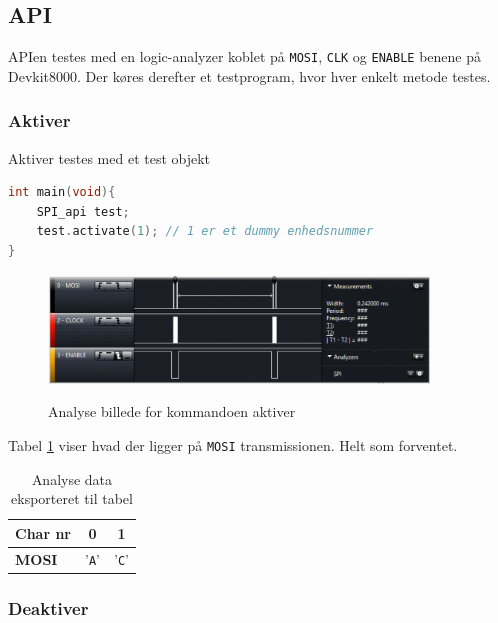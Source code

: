 
\subsection{API}

APIen testes med en logic-analyzer koblet på \verb+MOSI+, \verb+CLK+ og \verb+ENABLE+ benene på Devkit8000. Der køres derefter et testprogram, hvor hver enkelt metode testes.


\subsubsection*{Aktiver}

Aktiver testes med et test objekt

\begin{lstlisting}[language=C]
int main(void){
	SPI_api test;
	test.activate(1); // 1 er et dummy enhedsnummer
}
\end{lstlisting}

\begin{figure}[H]
\centering
{\includegraphics[width=0.90\textwidth]{filer/modultest/Billeder/mt_activate}}
\caption{Analyse billede for kommandoen aktiver}
\label{lab:mt_activate}
\end{figure}

Tabel \ref{table:mt_activate} viser hvad der ligger på \verb+MOSI+ transmissionen. Helt som forventet.

\begin{table}[H]
	\caption{Analyse data eksporteret til tabel}
	\centering
	\begin{tabular}{|l|c|c|}
		\hline 
		\textbf{Char nr} & \textbf{0} & \textbf{1} \\ 		
		\hline 
		\textbf{MOSI} & '\verb+A+' & '\verb+C+' \\ 
		\hline 
	\end{tabular} 
	\label{table:mt_activate}
\end{table}


\subsubsection*{Deaktiver}


